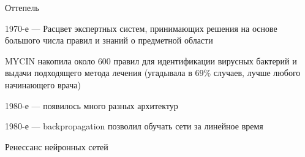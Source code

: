 \documentclass[notes,12pt, aspectratio=169]{beamer}
\newenvironment{wideitemize}{\itemize\addtolength{\itemsep}{10pt}}{\enditemize}
\begin{document}
\begin{frame}{Оттепель}
\begin{wideitemize} 
\item 1970-е — Расцвет экспертных систем, принимающих решения на основе большого числа правил и знаний о предметной области 

\item MYCIN накопила около $600$ правил для идентификации вирусных бактерий и выдачи подходящего метода лечения (угадывала в $69\%$ случаев, лучше любого начинающего врача)

\item 1980-е  — появилось много разных архитектур

\item 1980-е — backpropagation позволил обучать сети за линейное время

\item Ренессанс нейронных сетей 
\end{wideitemize} 
\end{frame}
\end{document}
